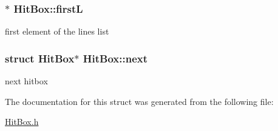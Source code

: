 \subsubsection[{\texorpdfstring{firstL}{firstL}}]{$\ast$ Hit\+Box\+::firstL}\hypertarget{structHitBox_a3f8b8bd82cf7afe309b505e17151fe00}{}\label{structHitBox_a3f8b8bd82cf7afe309b505e17151fe00}
first element of the lines\textquotesingle{} list 
\subsubsection[{\texorpdfstring{next}{next}}]{\setlength{\rightskip}{0pt plus 5cm}struct {\bf Hit\+Box}$\ast$ Hit\+Box\+::next}\hypertarget{structHitBox_a2009d8cf7256da486ceebcd8213c9708}{}\label{structHitBox_a2009d8cf7256da486ceebcd8213c9708}
next hitbox 

The documentation for this struct was generated from the following file\+:\begin{DoxyCompactItemize}
\item 
\hyperlink{HitBox_8h}{Hit\+Box.\+h}\end{DoxyCompactItemize}
